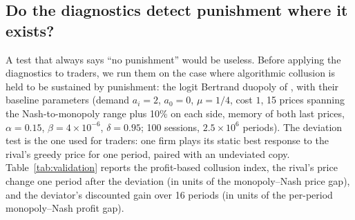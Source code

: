 \subsection{Do the diagnostics detect punishment where it exists?}
\label{sec:validation}

A test that always says ``no punishment'' would be useless. Before applying
the diagnostics to traders, we run them on the case where algorithmic
collusion is held to be sustained by punishment: the logit Bertrand duopoly
of \citet{calvano2020}, with their baseline parameters (demand
$a_i=2$, $a_0=0$, $\mu=1/4$, cost $1$, 15 prices spanning the Nash-to-monopoly
range plus 10\% on each side, memory of both last prices, $\alpha=0.15$,
$\beta=4\times10^{-6}$, $\delta=0.95$; 100 sessions, $2.5\times10^6$ periods).
The deviation test is the one used for traders: one firm plays its static
best response to the rival's greedy price for one period, paired with an
undeviated copy. Table~\ref{tab:validation} reports the profit-based collusion
index, the rival's price change one period after the deviation (in units of
the monopoly--Nash price gap), and the deviator's discounted gain over 16
periods (in units of the per-period monopoly--Nash profit gap).

\begin{table}[t]
  \centering
  \caption{Diagnostics outside the Kyle market. Logit Bertrand: the
  \citet{calvano2020} baseline and placebos. Dealers: two Q-learning market
  makers quoting asks against informed and liquidity buyers
  (Section~\ref{sec:dealers}). Rival response: price change one period after
  a forced best-response deviation, relative to the monopoly--Nash price gap.
  Deviator gain: discounted over 16 periods, relative to the per-period
  monopoly--Nash profit gap. Verdict ``punishment'' when the rival cuts its
  price and deviating loses, both significantly. 100 sessions; 95\% CIs.}
  \label{tab:validation}
  \resizebox{\linewidth}{!}{}
\end{table}

